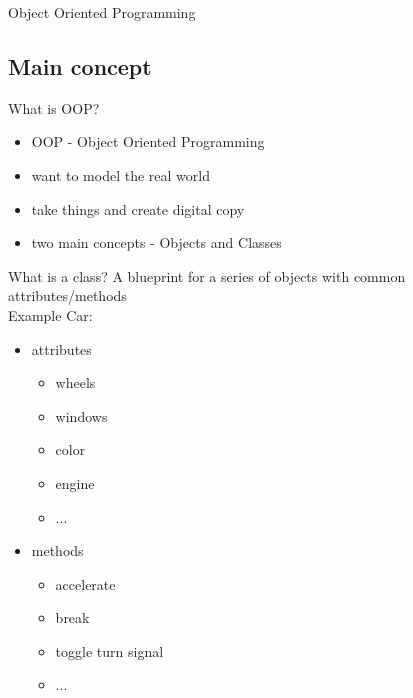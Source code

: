 	\begin{frame}{}
		\begin{center}
			{\huge Object Oriented Programming}
		\end{center}
	\end{frame}

	\subsection{Main concept}
	\begin{frame}[fragile]{What is OOP?}
		\begin{itemize}
			\item OOP - Object Oriented Programming
			\item want to model the real world
			\item take things and create digital copy
			\item two main concepts - Objects and Classes
		\end{itemize}	
	\end{frame}
	\begin{frame}[fragile]{What is a class?}
		A blueprint for a series of objects with common attributes/methods \\
		Example Car: \\
		\begin{itemize}
			\item<2-> attributes \\ \begin{itemize}
					\item wheels
					\item windows
					\item color
					\item engine
					\item ...
					
				\end{itemize}
			\item<3-> methods \\ 
						\begin{itemize}
							\item accelerate
							\item break
							\item toggle turn signal
							\item ...
						\end{itemize}
		\end{itemize}
		
	\end{frame}

